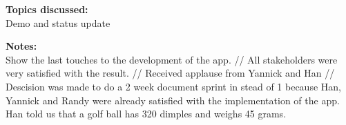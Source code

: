 \documentclass[12pt]{article}
\begin{document}
\textbf{Topics discussed:} \\
Demo and status update

\textbf{Notes:} \\
Show the last touches to the development of the app. //
All stakeholders were very satisfied with the result. //
Received applause from Yannick and Han //
Descision was made to do a 2 week document sprint in stead of 1 because Han, Yannick and Randy were already satisfied with the implementation of the app. \\
Han told us that a golf ball has 320 dimples and weighs 45 grams. \\
\end{document}
